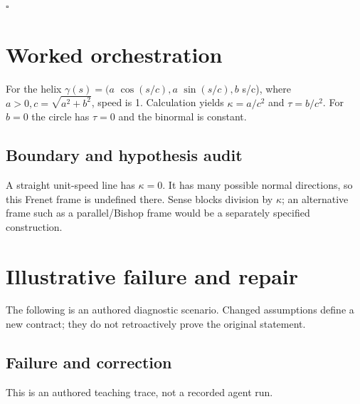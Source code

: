 \documentclass[preprint,12pt,aps,pra,showkeys,amsmath,amssymb,superscriptaddress,floatfix]{revtex4-2}
\theoremstyle{definition}
\theoremstyle{remark}
\begin{document}
\hfill$\square$

\section{Worked orchestration}

For the helix \(\gamma (s)=(a\) \(\operatorname{cos} (s/c),a\)
\(\operatorname{sin} (s/c),b\) s/c), where \(a>0,c=\sqrt{a^{2}+b^{2}}\),
speed is 1. Calculation yields \(\kappa =a/c^{2}\) and
\(\tau =b/c^{2}\). For \(b=0\) the circle has \(\tau =0\) and the
binormal is constant.

\subsection{Boundary and hypothesis audit}

A straight unit-speed line has \(\kappa =0\). It has many possible
normal directions, so this Frenet frame is undefined there. Sense blocks
division by \(\kappa\); an alternative frame such as a parallel/Bishop
frame would be a separately specified construction.

\section{Illustrative failure and repair}

The following is an authored diagnostic scenario. Changed assumptions
define a new contract; they do not retroactively prove the original
statement.

\subsection{Failure and correction}
This is an authored teaching trace, not a recorded agent run.
\end{document}
